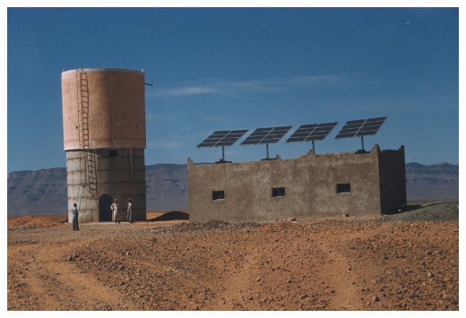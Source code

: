 \documentclass[xcolor={usenames,svgnames,dvipsnames}]{beamer}
\begin{document}
\begin{frame}[label={sec:orgee6cff7}]{}
\begin{center}
\includegraphics[width=.9\linewidth]{../figs/Bombeo.jpg}
\end{center}
\end{frame}
\end{document}
